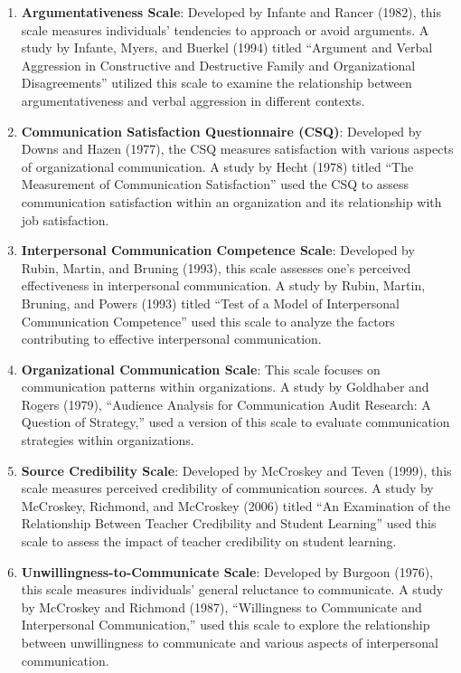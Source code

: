 \documentclass[
]{book}
\providecommand{\tightlist}{%
  \setlength{\itemsep}{0pt}\setlength{\parskip}{0pt}}
\begin{document}
\begin{enumerate}
\def\labelenumi{\arabic{enumi}.}
\tightlist
\item
  \textbf{Argumentativeness Scale}: Developed by Infante and Rancer (1982), this scale measures individuals' tendencies to approach or avoid arguments. A study by Infante, Myers, and Buerkel (1994) titled ``Argument and Verbal Aggression in Constructive and Destructive Family and Organizational Disagreements'' utilized this scale to examine the relationship between argumentativeness and verbal aggression in different contexts.
\item
  \textbf{Communication Satisfaction Questionnaire (CSQ)}: Developed by Downs and Hazen (1977), the CSQ measures satisfaction with various aspects of organizational communication. A study by Hecht (1978) titled ``The Measurement of Communication Satisfaction'' used the CSQ to assess communication satisfaction within an organization and its relationship with job satisfaction.
\item
  \textbf{Interpersonal Communication Competence Scale}: Developed by Rubin, Martin, and Bruning (1993), this scale assesses one's perceived effectiveness in interpersonal communication. A study by Rubin, Martin, Bruning, and Powers (1993) titled ``Test of a Model of Interpersonal Communication Competence'' used this scale to analyze the factors contributing to effective interpersonal communication.
\item
  \textbf{Organizational Communication Scale}: This scale focuses on communication patterns within organizations. A study by Goldhaber and Rogers (1979), ``Audience Analysis for Communication Audit Research: A Question of Strategy,'' used a version of this scale to evaluate communication strategies within organizations.
\item
  \textbf{Source Credibility Scale}: Developed by McCroskey and Teven (1999), this scale measures perceived credibility of communication sources. A study by McCroskey, Richmond, and McCroskey (2006) titled ``An Examination of the Relationship Between Teacher Credibility and Student Learning'' used this scale to assess the impact of teacher credibility on student learning.
\item
  \textbf{Unwillingness-to-Communicate Scale}: Developed by Burgoon (1976), this scale measures individuals' general reluctance to communicate. A study by McCroskey and Richmond (1987), ``Willingness to Communicate and Interpersonal Communication,'' used this scale to explore the relationship between unwillingness to communicate and various aspects of interpersonal communication.
\end{enumerate}
\end{document}
